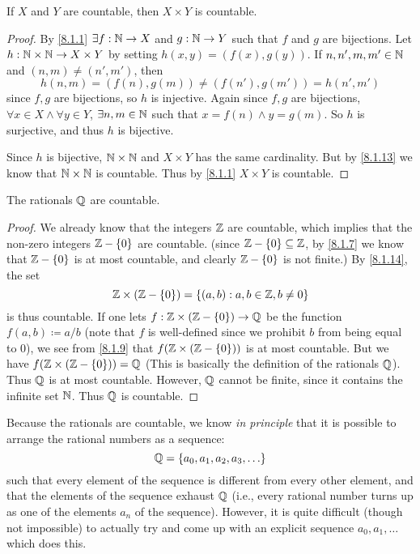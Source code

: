 \begin{cor}\label{8.1.14}
	If \(X\) and \(Y\) are countable, then \(X \times Y\) is countable.
\end{cor}

\begin{proof}
	By \cref{8.1.1} \(\exists f : \mathbb{N} \to X\) and \(g : \mathbb{N} \to Y\) such that \(f\) and \(g\) are bijections.
	Let \(h : \mathbb{N} \times \mathbb{N} \to X \times Y\) by setting \(h(x, y) = (f(x), g(y))\).
	If \(n, n', m, m' \in \mathbb{N}\) and \((n, m) \neq (n', m')\), then
	\[
		h(n, m) = (f(n), g(m)) \neq (f(n'), g(m')) = h(n', m')
	\]
	since \(f, g\) are bijections, so \(h\) is injective.
	Again since \(f, g\) are bijections, \(\forall x \in X \land \forall y \in Y\), \(\exists n, m \in \mathbb{N}\) such that \(x = f(n) \land y = g(m)\).
	So \(h\) is surjective, and thus \(h\) is bijective.

	Since \(h\) is bijective, \(\mathbb{N} \times \mathbb{N}\) and \(X \times Y\) has the same cardinality.
	But by \cref{8.1.13} we know that \(\mathbb{N} \times \mathbb{N}\) is countable.
	Thus by \cref{8.1.1} \(X \times Y\) is countable.
\end{proof}

\begin{cor}\label{8.1.15}
	The rationals \(\mathbb{Q}\) are countable.
\end{cor}

\begin{proof}
	We already know that the integers \(\mathbb{Z}\) are countable, which implies that the non-zero integers \(\mathbb{Z} - \left\lbrace0\right\rbrace\) are countable.
	(since \(\mathbb{Z} - \left\lbrace0\right\rbrace \subseteq \mathbb{Z}\), by \cref{8.1.7} we know that \(\mathbb{Z} - \left\lbrace0\right\rbrace\) is at most countable, and clearly \(\mathbb{Z} - \left\lbrace0\right\rbrace\) is not finite.)
	By \cref{8.1.14}, the set
	\[
		\mathbb{Z} \times (\mathbb{Z} - \left\lbrace0\right\rbrace) = \left\lbrace(a, b) : a, b \in \mathbb{Z}, b \neq 0\right\rbrace
	\]
	is thus countable.
	If one lets \(f : \mathbb{Z} \times (\mathbb{Z} - \left\lbrace0\right\rbrace) \to \mathbb{Q}\) be the function \(f(a, b) \coloneqq a / b\)
	(note that \(f\) is well-defined since we prohibit \(b\) from being equal to \(0\)), we see from \cref{8.1.9} that \(f(\mathbb{Z} \times (\mathbb{Z} - \left\lbrace0\right\rbrace))\) is at most countable.
	But we have \(f(\mathbb{Z} \times (\mathbb{Z} - \left\lbrace0\right\rbrace)) = \mathbb{Q}\)
	(This is basically the definition of the rationals \(\mathbb{Q}\)).
	Thus \(\mathbb{Q}\) is at most countable.
	However, \(\mathbb{Q}\) cannot be finite, since it contains the infinite set \(\mathbb{N}\).
	Thus \(\mathbb{Q}\) is countable.
\end{proof}

\begin{rmk}\label{8.1.16}
	Because the rationals are countable, we know \emph{in principle} that it is possible to arrange the rational numbers as a sequence:
	\[
		\Q = \set{a_0, a_1, a_2, a_3, \dots}
	\]
	such that every element of the sequence is different from every other element, and that the elements of the sequence exhaust \(\mathbb{Q}\)
	(i.e., every rational number turns up as one of the elements \(a_n\) of the sequence).
	However, it is quite difficult (though not impossible) to actually try and come up with an explicit sequence \(a_0, a_1, \dots\) which does this.
\end{rmk}


